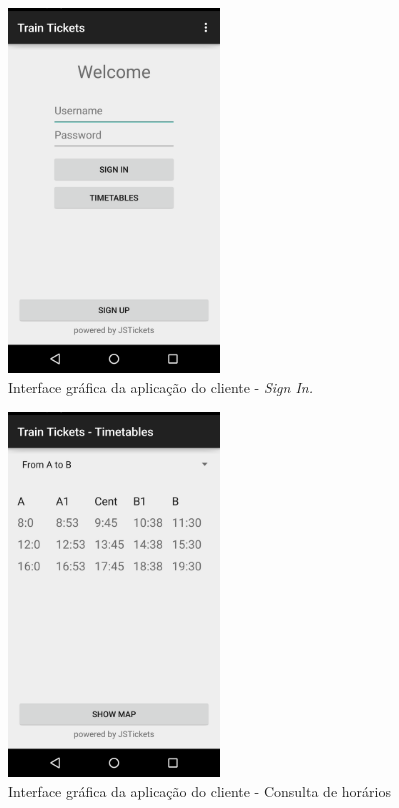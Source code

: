\documentclass[12pt]{article}
\begin{document}
\begin{figure}[H]
    \centering
    \includegraphics[width=0.5\textwidth]{Screenshot_Sign_In.png}
    \caption{Interface gráfica da aplicação do cliente - \textit{Sign In.}}
    \label{fig:c1}
\end{figure}

\begin{figure}[H]
	\centering
	\includegraphics[width=0.5\textwidth]{Screenshot_Timetables.png}
	\caption{Interface gráfica da aplicação do cliente - Consulta de horários}
	\label{fig:c2}
\end{figure}
\end{document}
